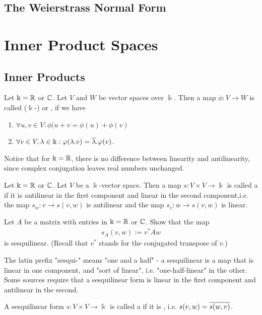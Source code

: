 \section{The Weierstrass Normal Form}
\chapter{Inner Product Spaces}
\section{Inner Products}
\begin{definition}
	Let $\Bbbk = \mathbb{R}$ or $\mathbb{C}$. Let $V$ and $W$ be vector spaces over $\Bbbk$. Then a map $\phi : V \to W$ is called ($\Bbbk$-)  or , if we have
	\begin{enumerate}
		\item {} $\forall u,v \in V : \phi(u+v = \phi(u) + \phi(v)$
		\item {} $\forall v \in V, \lambda \in \Bbbk : \varphi(\lambda.v) = \overline{{\lambda}} . \varphi(v)$.
	\end{enumerate}
\end{definition}
Notice that for $\Bbbk = \mathbb{R}$, there is no difference between linearity and antilinearity, since complex conjugation leaves real numbers unchanged.
\begin{definition}
	Let $\Bbbk = \mathbb{R}$ or $\mathbb{C}$. Let $V$ be a $\Bbbk$-vector space. Then a map $s : V \times V \to \Bbbk$ is called a  if it is antilinear in the first component and linear in the second component,i.e. the map $s_w : v \to s(v,w)$ is antilinear and the map $s_v : w \to s(v,w)$ is linear.
\end{definition}
\begin{exercise}
	Let $A$ be a matrix with entries in $\Bbbk = \mathbb{R}$ or $\mathbb{C}$. Show that the map
	\begin{align*}
		s_A(v,w) := v^*Aw
	\end{align*}
	is sesquilinear. (Recall that $v^*$ stands for the conjugated transpose of $v$.)	
\end{exercise}
The latin prefix "sesqui-" means "one and a half" - a sesquilinear is a map that is linear in one component, and "sort of linear", i.e. "one-half-linear" in the other. Some sources require that a sesquilinear form is linear in the first component and antilinear in the second.
\begin{definition}
	A sesquilinear form $s : V \times V \to \Bbbk$ is called a  if it is , i.e.
	$s(v,w) = \overline{{s(w,v)}}$.
\end{definition}
